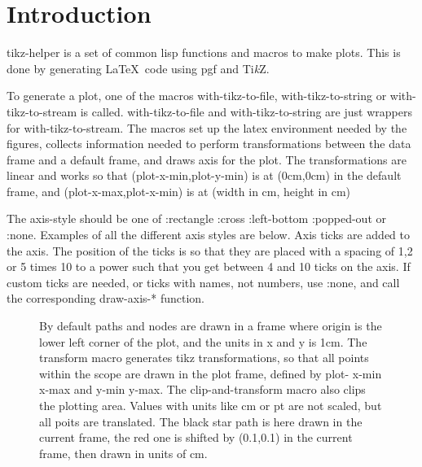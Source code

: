 \documentclass{article}
\begin{document}
\section{Introduction}


tikz-helper is a set of common lisp functions and macros to make plots. This is done by 
generating \LaTeX \ code using pgf and {Ti\textit{k}Z}.



To generate a plot, one of the macros with-tikz-to-file, with-tikz-to-string or with-tikz-to-stream is called.
with-tikz-to-file and with-tikz-to-string are just wrappers for with-tikz-to-stream.
The macros set up the latex environment needed by the figures, collects information needed to perform 
transformations between the data frame and a default frame, and draws axis for the plot. The transformations are
linear and works so that (plot-x-min,plot-y-min) is at (0cm,0cm) in the default frame, and  (plot-x-max,plot-x-min) is at (width in cm, height in cm)



The axis-style should be one of :rectangle :cross :left-bottom :popped-out or :none.
Examples of all the different axis styles are below. Axis ticks are added to the axis. The position of the ticks is so
that they are placed with a spacing of 1,2 or 5 times 10 to a power such that you get between 4 and 10 ticks on the 
axis. If custom ticks are needed, or ticks with names, not numbers, use :none, and call the corresponding draw-axis-*
function.

\begin{figure}[H]
\centering

\captionsetup{singlelinecheck=off}
\caption[asdf]{By default paths and nodes are drawn in a frame where origin is the lower left corner of the plot,
and the units in x and y is 1cm. The transform macro generates tikz transformations, so that all points
within the scope are drawn in the plot frame, defined by plot- x-min x-max and y-min y-max.
 The clip-and-transform macro also clips the plotting area. Values with units like cm or pt are not scaled, 
but all poits are translated. The black star path is here drawn in the current frame, the red one 
is shifted by (0.1,0.1) in the current frame, then drawn in units of cm.}
\end{figure}
\end{document}
